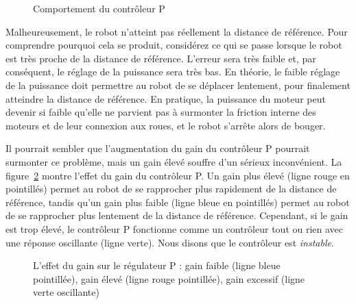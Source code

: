 \begin{figure}
\begin{center}
\caption{Comportement du contrôleur P}\label{fig.p-control}
\end{center}
\end{figure}

Malheureusement, le robot n'atteint pas réellement la distance de référence. Pour comprendre pourquoi cela se produit, considérez ce qui se passe lorsque le robot est très proche de la distance de référence. L'erreur sera très faible et, par conséquent, le réglage de la puissance sera très bas. En théorie, le faible réglage de la puissance doit permettre au robot de se déplacer lentement, pour finalement atteindre la distance de référence. En pratique, la puissance du moteur peut devenir si faible qu'elle ne parvient pas à surmonter la friction interne des moteurs et de leur connexion aux roues, et le robot s'arrête alors de bouger.

Il pourrait sembler que l'augmentation du gain du contrôleur P pourrait surmonter ce problème, mais un gain élevé souffre d'un sérieux inconvénient. La figure~\ref{fig.gain} montre l'effet du gain du contrôleur P. Un gain plus élevé (ligne rouge en pointillés) permet au robot de se rapprocher plus rapidement de la distance de référence, tandis qu'un gain plus faible (ligne bleue en pointillés) permet au robot de se rapprocher plus lentement de la distance de référence. Cependant, si le gain est trop élevé, le contrôleur P fonctionne comme un contrôleur tout ou rien avec une réponse oscillante (ligne verte). Nous disons que le contrôleur est \emph{instable}.

\begin{figure}
\begin{center}
\caption{L'effet du gain sur le régulateur P : gain faible (ligne bleue pointillée), gain élevé (ligne rouge pointillée), gain excessif (ligne verte oscillante)}\label{fig.gain}
\end{center}
\end{figure}

